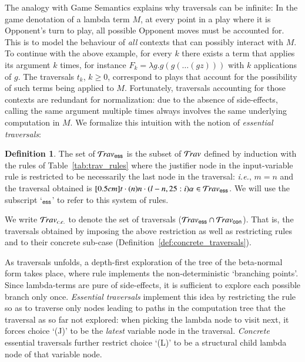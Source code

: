 \documentclass{elsarticle}
\makeatletter
\theoremstyle{plain}
\theoremstyle{definition}
\newtheorem{definition}{Definition}[section]
\theoremstyle{remark}
\newcommand\Nodes{\mathcal{N}}%
\newcommand\NodesVar{\Nodes_{\sf var}}%
\newcommand{\essential}{{\sf ess}}
\newcommand{\concrete}{{\sf con}}
\newcommand{\travsetes}{{\travset_\essential}}
\newcommand{\travsetcon}{{\travset_\concrete}}
\newcommand{\travsetcones}{{\travset_{c.e.}}} %
\newcommand{\travulc}{\travset}
\newcommand{\rulefont}[1]{\mathbf{\sf #1}}
\newcommand{\enables}{\vdash} %
\newcommand{\ExternalNodes}{\Nodes^{\sf ext}}
\renewcommand\ie{{\it i.e.\@\xspace}}
\makeatother
\begin{document}
The analogy with Game Semantics explains why traversals can be infinite: In the game denotation of a lambda term $M$, at every point in a play where it is Opponent's turn to play, all possible Opponent moves must be accounted for.
This is to model the behaviour of \emph{all} contexts that can possibly interact with $M$. To continue with the above example, for every $k$ there exists a term that applies its argument $k$ times, for instance $F_k = \lambda g . g (g ( \ldots (g z)))$ with $k$ applications of $g$.
The traversals $t_k$, $k\geq 0$, correspond to plays
 that account for the possibility of
 such terms being applied to $M$. Fortunately, traversals accounting for those contexts are redundant for normalization: due to the absence of side-effects, calling the same argument multiple times always involves the same underlying computation in $M$. We formalize this intuition with the notion of \emph{essential traversals}:

\begin{definition}
\label{dfn:essential_traversals}
The set of  $\travsetes$ is the subset of $\travulc$ defined by induction with the rules of Table~\ref{tab:trav_rules} where the justifier node in the
input-variable rule  is restricted to be necessarily the last node in the traversal: \ie, $m=n$ and the traversal obtained is $\Pstr[0.5cm]{t \cdot (n){n} \cdot (l-n,25:i){\alpha}} \in \travsetes$.
We will use the subscript `${}_\essential$' to refer to this system of rules.

We write $\travsetcones$ to denote the set of
 traversals ($\travsetes \inter \travsetcon$).
 That is, the traversals obtained by imposing the above restriction as well as restricting rules  and  to their concrete sub-case (Definition~\ref{def:concrete_traversals}).
\end{definition}

As traversals unfolds, a depth-first exploration of the tree of the beta-normal form takes place, where rule  implements the non-deterministic `branching points'. Since lambda-terms are pure of side-effects,
it is sufficient to explore each possible branch only once.
\emph{Essential traversals} implement this idea by restricting the rule  so as to traverse only nodes leading to paths in the computation tree that the traversal as so far not explored: when picking the lambda node to visit next, it forces choice `(J)' to be the \emph{latest} variable node in the traversal. \emph{Concrete} essential traversals further restrict choice `(L)' to be a structural child lambda node of that variable node.
\end{document}
